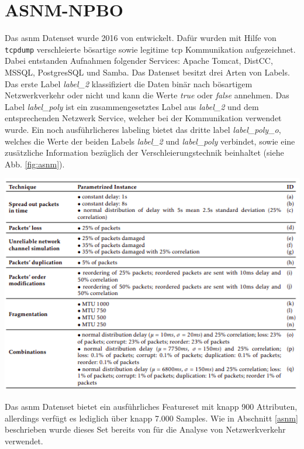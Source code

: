 \documentclass[
    12pt, %
    DIV10,
    ngerman, %
    a4paper, %
    oneside, %
    titlepage, %
    parskip=half, %
    headings=normal, %
    listof=totoc, %
    bibliography=totoc, %
    index=totoc, %
    captions=tableheading, %
    final %
]{scrreprt}
\begin{document}
\section{ASNM-NPBO}
Das \ac{asnm} Datenset wurde 2016 von \textcite{phdthesis} entwickelt. Dafür wurden mit Hilfe von \texttt{tcpdump} verschleierte bösartige sowie legitime \ac{tcp} Kommunikation aufgezeichnet. Dabei entstanden Aufnahmen folgender Services: Apache Tomcat, DistCC, MSSQL, PostgresSQL und Samba. Das Datenset besitzt drei Arten von Labels. Das erste Label \emph{label\_2} klassifiziert die Daten binär nach bösartigem Netzwerkverkehr oder nicht und kann die Werte \emph{true} oder \emph{false} annehmen. Das Label \emph{label\_poly} ist ein zusammengesetztes Label aus \emph{label\_2} und dem entsprechenden Netzwerk Service, welcher bei der Kommunikation verwendet wurde. Ein noch ausführlicheres labeling bietet das dritte label \emph{label\_poly\_o}, welches die Werte der beiden Labels \emph{label\_2} und \emph{label\_poly} verbindet, sowie eine zusätzliche Information bezüglich der Verschleierungstechnik beinhaltet (siehe Abb. \ref{fig:asnm}).
\begin{center}
\includegraphics[scale=0.7]{img/asnm.png}
\label{fig:asnm}
\end{center}
Das \ac{asnm} Datenset bietet ein ausführliches Featureset mit knapp 900 Attributen, allerdings verfügt es lediglich über knapp 7.000 Samples. Wie in Abschnitt \ref{asnm} beschrieben wurde dieses Set bereits von \textcite{Teoh2018} für die Analyse von Netzwerkverkehr verwendet.
\end{document}
